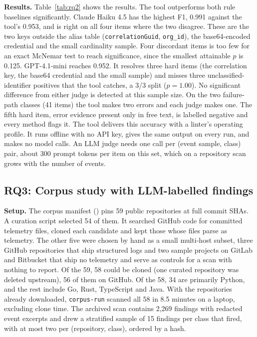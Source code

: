\documentclass[conference]{IEEEtran}
\begin{document}
\textbf{Results.} Table~\ref{tab:rq2} shows the results. The tool outperforms both rule baselines significantly. Claude Haiku 4.5 has the highest F1, 0.991 against the tool's 0.953, and is right on all four items where the two disagree. These are the two keys outside the alias table (\texttt{correlationGuid}, \texttt{org\_id}), the base64-encoded credential and the small cardinality sample. Four discordant items is too few for an exact McNemar test to reach significance, since the smallest attainable $p$ is 0.125. GPT-4.1-mini reaches 0.952. It resolves three hard items (the correlation key, the base64 credential and the small sample) and misses three unclassified-identifier positives that the tool catches, a 3/3 split ($p = 1.00$). No significant difference from either judge is detected at this sample size. On the two failure-path classes (41 items) the tool makes two errors and each judge makes one. The fifth hard item, error evidence present only in free text, is labelled negative and every method flags it. The tool delivers this accuracy with a linter's operating profile. It runs offline with no API key, gives the same output on every run, and makes no model calls. An LLM judge needs one call per (event sample, class) pair, about 300 prompt tokens per item on this set, which on a repository scan grows with the number of events.

\subsection{RQ3: Corpus study with LLM-labelled findings}\label{sec:rq3}

\textbf{Setup.} The corpus manifest () pins 59 public repositories at full commit SHAs. A curation script selected 54 of them. It searched GitHub code for committed telemetry files, cloned each candidate and kept those whose files parse as telemetry. The other five were chosen by hand as a small multi-host subset, three GitHub repositories that ship structured logs and two sample projects on GitLab and Bitbucket that ship no telemetry and serve as controls for a scan with nothing to report. Of the 59, 58 could be cloned (one curated repository was deleted upstream), 56 of them on GitHub. Of the 58, 34 are primarily Python, and the rest include Go, Rust, TypeScript and Java. With the repositories already downloaded, \texttt{corpus-run} scanned all 58 in 8.5 minutes on a laptop, excluding clone time. The archived scan contains 2,269 findings with redacted event excerpts and drew a stratified sample of 15 findings per class that fired, with at most two per (repository, class), ordered by a hash.
\end{document}
